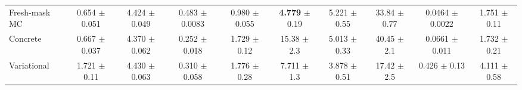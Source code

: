 \begin{table}[t]
\begin{tabular}{lccccccccc}
Fresh-mask MC & \makecell{0.654\\ {\footnotesize $\pm$ 0.051}} & \makecell{4.424\\ {\footnotesize $\pm$ 0.049}} & \makecell{0.483\\ {\footnotesize $\pm$ 0.0083}} & \makecell{0.980\\ {\footnotesize $\pm$ 0.055}} & \makecell{\textbf{4.779}\\ {\footnotesize $\pm$ 0.19}} & \makecell{5.221\\ {\footnotesize $\pm$ 0.55}} & \makecell{33.84\\ {\footnotesize $\pm$ 0.77}} & \makecell{0.0464\\ {\footnotesize $\pm$ 0.0022}} & \makecell{1.751\\ {\footnotesize $\pm$ 0.11}} \\
Concrete & \makecell{0.667\\ {\footnotesize $\pm$ 0.037}} & \makecell{4.370\\ {\footnotesize $\pm$ 0.062}} & \makecell{0.252\\ {\footnotesize $\pm$ 0.018}} & \makecell{1.729\\ {\footnotesize $\pm$ 0.12}} & \makecell{15.38\\ {\footnotesize $\pm$ 2.3}} & \makecell{5.013\\ {\footnotesize $\pm$ 0.33}} & \makecell{40.45\\ {\footnotesize $\pm$ 2.1}} & \makecell{0.0661\\ {\footnotesize $\pm$ 0.011}} & \makecell{1.732\\ {\footnotesize $\pm$ 0.21}} \\
Variational & \makecell{1.721\\ {\footnotesize $\pm$ 0.11}} & \makecell{4.430\\ {\footnotesize $\pm$ 0.063}} & \makecell{0.310\\ {\footnotesize $\pm$ 0.058}} & \makecell{1.776\\ {\footnotesize $\pm$ 0.28}} & \makecell{7.711\\ {\footnotesize $\pm$ 1.3}} & \makecell{3.878\\ {\footnotesize $\pm$ 0.51}} & \makecell{17.42\\ {\footnotesize $\pm$ 2.5}} & \makecell{0.426\\ {\footnotesize $\pm$ 0.13}} & \makecell{4.111\\ {\footnotesize $\pm$ 0.58}} \\

\end{tabular}
\end{table}
